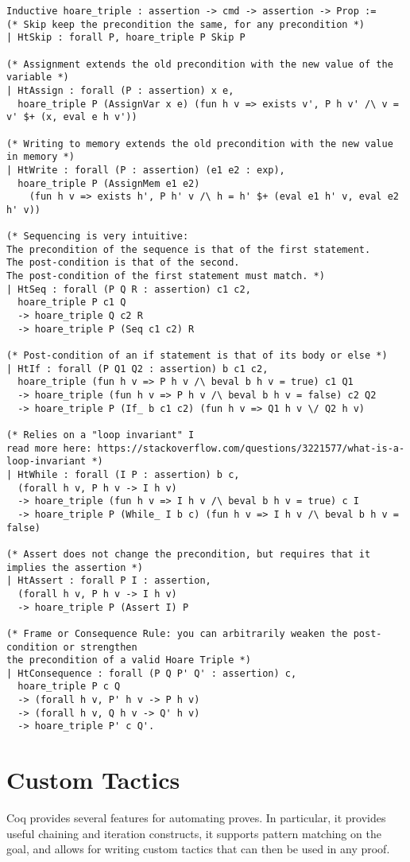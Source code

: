 \documentclass{article}
\begin{document}
\begin{verbatim}
Inductive hoare_triple : assertion -> cmd -> assertion -> Prop :=
(* Skip keep the precondition the same, for any precondition *)
| HtSkip : forall P, hoare_triple P Skip P

(* Assignment extends the old precondition with the new value of the variable *)
| HtAssign : forall (P : assertion) x e,
  hoare_triple P (AssignVar x e) (fun h v => exists v', P h v' /\ v = v' $+ (x, eval e h v'))

(* Writing to memory extends the old precondition with the new value in memory *)
| HtWrite : forall (P : assertion) (e1 e2 : exp),
  hoare_triple P (AssignMem e1 e2) 
    (fun h v => exists h', P h' v /\ h = h' $+ (eval e1 h' v, eval e2 h' v))

(* Sequencing is very intuitive:
The precondition of the sequence is that of the first statement.
The post-condition is that of the second.
The post-condition of the first statement must match. *)
| HtSeq : forall (P Q R : assertion) c1 c2,
  hoare_triple P c1 Q
  -> hoare_triple Q c2 R
  -> hoare_triple P (Seq c1 c2) R

(* Post-condition of an if statement is that of its body or else *)
| HtIf : forall (P Q1 Q2 : assertion) b c1 c2,
  hoare_triple (fun h v => P h v /\ beval b h v = true) c1 Q1
  -> hoare_triple (fun h v => P h v /\ beval b h v = false) c2 Q2
  -> hoare_triple P (If_ b c1 c2) (fun h v => Q1 h v \/ Q2 h v)

(* Relies on a "loop invariant" I
read more here: https://stackoverflow.com/questions/3221577/what-is-a-loop-invariant *)
| HtWhile : forall (I P : assertion) b c,
  (forall h v, P h v -> I h v)
  -> hoare_triple (fun h v => I h v /\ beval b h v = true) c I
  -> hoare_triple P (While_ I b c) (fun h v => I h v /\ beval b h v = false)

(* Assert does not change the precondition, but requires that it implies the assertion *)
| HtAssert : forall P I : assertion,
  (forall h v, P h v -> I h v)
  -> hoare_triple P (Assert I) P

(* Frame or Consequence Rule: you can arbitrarily weaken the post-condition or strengthen
the precondition of a valid Hoare Triple *)
| HtConsequence : forall (P Q P' Q' : assertion) c,
  hoare_triple P c Q
  -> (forall h v, P' h v -> P h v)
  -> (forall h v, Q h v -> Q' h v)
  -> hoare_triple P' c Q'.
\end{verbatim}

\section{Custom Tactics}
Coq provides several features for automating proves. In particular, it provides useful chaining and iteration constructs, it supports pattern matching on the goal, and allows for writing custom tactics that can then be used in any proof. \\
\end{document}
